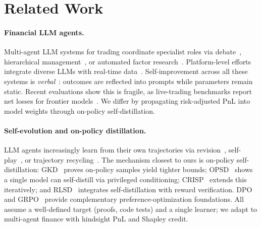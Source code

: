 \section{Related Work}
\label{sec:related}

\paragraph{Financial LLM agents.}
Multi-agent LLM systems for trading coordinate specialist roles via debate~\cite{tradingagents2025,hedgeagents2025}, hierarchical management~\cite{fincon2024,finteam2025}, or automated factor research~\cite{rdagent2025,alphaagent2025,quantagent2026}. Platform-level efforts integrate diverse LLMs with real-time data~\cite{finrobot2024,finagent2024}. Self-improvement across all these systems is \emph{verbal}~\cite{reflexion2023,tradinggroup2025}: outcomes are reflected into prompts while parameters remain static. Recent evaluations show this is fragile, as live-trading benchmarks report net losses for frontier models~\cite{deepfund2025,profitmirage2025}. We differ by propagating risk-adjusted PnL into model weights through on-policy self-distillation.

\paragraph{Self-evolution and on-policy distillation.}
LLM agents increasingly learn from their own trajectories via revision~\cite{seagent2025}, self-play~\cite{selfchallenge2025,agent02026,sirius2025}, or trajectory recycling~\cite{rzero2026,seea2025}. The mechanism closest to ours is on-policy self-distillation: GKD~\cite{gkd2024} proves on-policy samples yield tighter bounds; OPSD~\cite{opsd2026} shows a single model can self-distill via privileged conditioning; CRISP~\cite{crisp2026} extends this iteratively; and RLSD~\cite{rlsd2026} integrates self-distillation with reward verification. DPO~\cite{dpo2023} and GRPO~\cite{grpo2024} provide complementary preference-optimization foundations. All assume a well-defined target (proofs, code tests) and a single learner; we adapt to multi-agent finance with hindsight PnL and Shapley credit.

